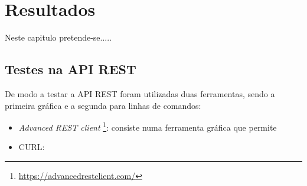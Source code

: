 \chapter{Resultados}

Neste capitulo pretende-se..... 


\section{Testes na API REST}

De modo a testar a API REST foram utilizadas duas ferramentas, sendo a primeira gráfica e a segunda para linhas de comandos: 

\begin{itemize}
	\item \textit{Advanced REST client} \footnote{\url{https://advancedrestclient.com/}}: consiste numa ferramenta gráfica que permite 
	\item CURL: 
\end{itemize}





